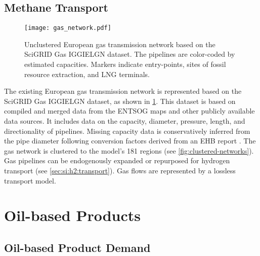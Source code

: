 \subsection{Methane Transport}
\label{sec:si:methane:transport}

\begin{figure}
    \texttt{[image: gas\_network.pdf]}
    \label{fig:gas-raw}
    \caption{Unclustered European gas transmission network based on the
    SciGRID Gas IGGIELGN dataset. The pipelines are color-coded by estimated capacities. Markers indicate entry-points, sites of fossil resource extraction, and LNG terminals.}
\end{figure}

The existing European gas transmission network is represented based on the
SciGRID Gas IGGIELGN dataset, as shown in
\cref{fig:gas-raw}. This dataset is based on compiled and merged data from the
ENTSOG maps and other publicly available
data sources. It includes data on the capacity, diameter, pressure, length, and
directionality of pipelines. Missing capacity data is conservatively inferred
from the pipe diameter following conversion factors derived from an EHB report
. The gas network is clustered to the
model's 181 regions (see \cref{fig:clustered-networks}). Gas pipelines can be
endogenously expanded or repurposed for hydrogen transport (see
\cref{sec:si:h2:transport}). Gas flows are represented by a lossless transport
model.


\section{Oil-based Products}
\label{sec:si:oil}

\subsection{Oil-based Product Demand}
\label{sec:si:demand}

